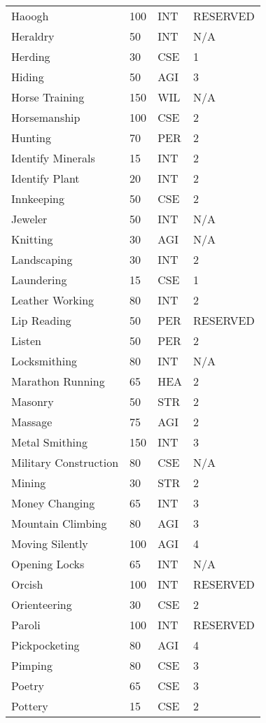 \begin{normbox}
\begin{tabularx}{\linewidth}{@{} l X X X }
Haoogh & 100 & INT & RESERVED \\
Heraldry & 50 & INT & N/A \\
Herding & 30 & CSE & 1 \\
Hiding & 50 & AGI & 3 \\
Horse Training & 150 & WIL & N/A \\
Horsemanship & 100 & CSE & 2 \\
Hunting & 70 & PER & 2 \\
Identify Minerals & 15 & INT & 2 \\
Identify Plant & 20 & INT & 2 \\
Innkeeping & 50 & CSE & 2 \\
Jeweler & 50 & INT & N/A \\
Knitting & 30 & AGI & N/A \\
Landscaping & 30 & INT & 2 \\
Laundering & 15 & CSE & 1 \\
Leather Working & 80 & INT & 2 \\
Lip Reading & 50 & PER & RESERVED \\
Listen & 50 & PER & 2 \\
Locksmithing & 80 & INT & N/A \\
Marathon Running & 65 & HEA & 2 \\
Masonry & 50 & STR & 2 \\
Massage & 75 & AGI & 2 \\
Metal Smithing & 150 & INT & 3 \\
Military Construction & 80 & CSE & N/A \\
Mining & 30 & STR & 2 \\
Money Changing & 65 & INT & 3 \\
Mountain Climbing & 80 & AGI & 3 \\
Moving Silently & 100 & AGI & 4 \\
Opening Locks & 65 & INT & N/A \\
Orcish & 100 & INT & RESERVED \\
Orienteering & 30 & CSE & 2 \\
Paroli & 100 & INT & RESERVED \\
Pickpocketing & 80 & AGI & 4 \\
Pimping & 80 & CSE & 3 \\
Poetry & 65 & CSE & 3 \\
Pottery & 15 & CSE & 2 \\

\end{tabularx}
\end{normbox}
